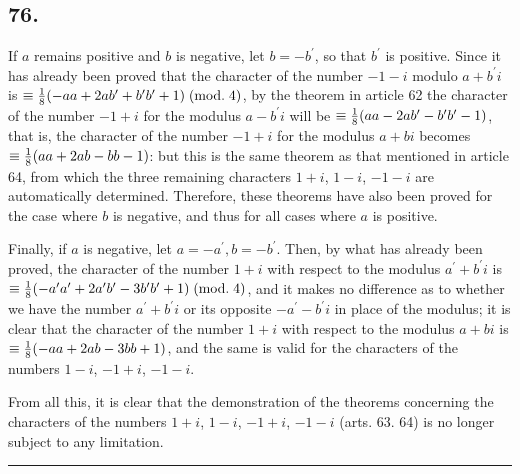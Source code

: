 \documentclass[twoside,12pt]{memoir}
\renewcommand{\pmod}[1]{\;(\textrm{mod.}\;#1)}
\let\oldfrac\frac
\def\frac#1#2{\mathchoice{\tfrac{#1}{#2}}{\oldfrac{#1}{#2}}{\genfrac{}{}{}{2}{#1}{#2\mathstrut}}{\genfrac{}{}{}{3}{#1}{#2\mathstrut}}}
\begin{document}
\subsection*{76.}

If \(a\) remains positive and \(b\) is negative, let \(b=-b^{\prime}\), so that \(b^{\prime}\) is positive. Since it has already been proved that the character of the number \(-1-i\) modulo \(a+b^{\prime} i\) is \(\equiv \frac{1}{8}(-a a+2 a b^{\prime}+b^{\prime} b^{\prime}+1)\pmod{4}\), by the theorem in article 62 the character of the number \(-1+i\) for the modulus \(a-b^{\prime} i\) will be \(\equiv \frac{1}{8}(a a-2 a b^{\prime}-b^{\prime} b^{\prime}-1)\), that is, the character of the number \(-1+i\) for the modulus \(a+b i\) becomes \(\equiv \frac{1}{8}(a a+2 a b-b b-1)\): but this is the same theorem as that mentioned in article 64, from which the three remaining characters \(1+i\), \(1-i\), \(-1-i\) are automatically determined. Therefore, these theorems have also been proved for the case where \(b\) is negative, and thus for all cases where \(a\) is positive.

Finally, if \(a\) is negative, let \(a=-a^{\prime}, b=-b^{\prime}\).  Then, by what has already been proved, the character of the number \(1+i\) with respect to the modulus \(a^{\prime}+b^{\prime} i\) is \(\equiv \frac{1}{8}(-a^{\prime} a^{\prime}+2 a^{\prime} b^{\prime}-3 b^{\prime} b^{\prime}+1)\pmod{4}\), and it makes no difference as to whether we have the number \(a^{\prime}+b^{\prime} i\) or its opposite \(-a^{\prime}-b^{\prime} i\) in place of the modulus; it is clear that the character of the number \(1+i\) with respect to the modulus \(a+b i\) is \(\equiv \frac{1}{8}(-a a+2 a b-3 b b+1)\), and the same is valid for the characters of the numbers \(1-i\), \(-1+i\), \(-1-i\).

From all this, it is clear that the demonstration of the theorems concerning the characters of the numbers \(1+i\), \(1-i\), \(-1+i\), \(-1-i\) (arts. 63. 64) is no longer subject to any limitation.

\begin{center}\rule{1.5in}{0.5pt}\end{center}
\end{document}
